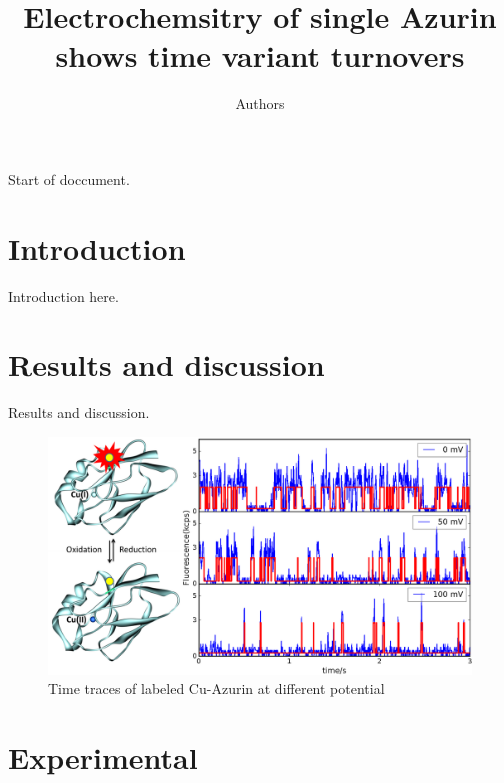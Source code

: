 \documentclass[journal=bichaw,manuscript=article]{achemso}
\author{Authors}
\title[An \textsf{achemso} demo]
  {Electrochemsitry of single Azurin shows time variant turnovers}
\begin{document}
Start of doccument.


\section{Introduction}
Introduction here.
\section{Results and discussion\label{sec:results}}
Results and discussion.
\begin{figure}
	\includegraphics[width=\textwidth]{Figure/Figure_2_timetrace_CuAzu.eps}
	\caption{Time traces of labeled Cu-Azurin at different potential}
	\label{fig:timetrace}
\end{figure}

\section{Experimental}

\end{document}
